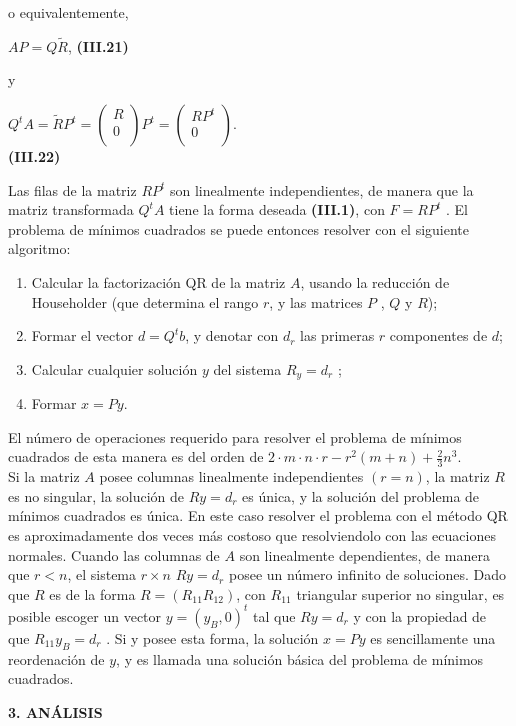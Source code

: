 \documentclass[twocolumn,twoside]{article}
\begin{document}
o equivalentemente,
\begin{center}
  $A P = Q\tilde{R} $, \hspace{2cm}\textbf{(III.21)}
\end{center}
y 
\begin{center}
  $Q^tA=\tilde{R}P^t =
  \left(\begin{array}{c}
  R\\ 
  0\\
 \end{array}\right)P^t=
 \left(\begin{array}{cc}
  RP^t\\ 
  0\\
 \end{array}\right)
 $. \\ \vspace{0.2cm}\textbf{(III.22)}
\end{center}
Las filas de la matriz $R P^t$ son linealmente independientes, de manera que la matriz
transformada $Q^t A$ tiene la forma deseada \textbf{(III.1)}, con $F = R P^t$ . El problema de
m\'inimos cuadrados se puede entonces resolver con el siguiente algoritmo:
\begin{enumerate}[label=(\roman*)]

  \item Calcular la factorizaci\'on QR de la matriz $A$, usando la reducci\'on de Householder (que
  determina el rango $r$, y las matrices $P$ , $Q$ y $R$);
  \item Formar el vector $d = Q^t b$, y denotar con $d_r$ las primeras $r$ componentes de $d$;
  \item Calcular cualquier soluci\'on $y$ del sistema $R_y = d_r$ ;
  \item Formar $x = Py$.
\end{enumerate}

El n\'umero de operaciones requerido para resolver el problema de m\'inimos cuadrados
de esta manera es del orden de $2\cdot m\cdot n\cdot r - r^2 (m + n) + \frac{2}{3} n^3$.\\
Si la matriz $A$ posee columnas linealmente independientes $(r = n)$, la matriz $R$ es no
singular, la soluci\'on de $Ry = d_r$ es \'unica, y la soluci\'on del problema de m\'inimos cuadrados 
es \'unica. En este caso resolver el problema con el m\'etodo QR es aproximadamente
dos veces m\'as costoso que resolviendolo con las ecuaciones normales. Cuando las columnas
 de $A$ son linealmente dependientes, de manera que $r < n$, el sistema $r\times n$ $Ry = d_r$
posee un n\'umero infinito de soluciones. Dado que $R$ es de la forma $R = (R_{11} R_{12} )$, con
$R_{11}$ triangular superior no singular, es posible escoger un vector $y = (y_B , 0)^t$ tal que
$R y = d_r$ y con la propiedad de que $R_{11} y_B = d_r$ . Si y posee esta forma, la soluci\'on
$x = Py$ es sencillamente una reordenaci\'on de $y$, y es llamada una soluci\'on b\'asica del
problema de m\'inimos cuadrados.
\begin{center}
{\large \bf 3. AN\'ALISIS}
\end{center}
\end{document}
